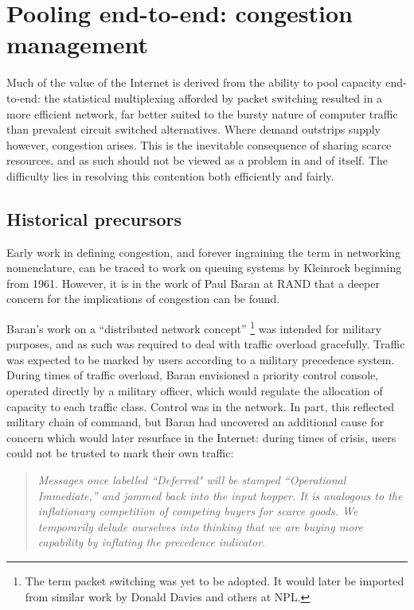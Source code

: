 \section{Pooling end-to-end: congestion management}
\label{sec:resourcepooling:congestion}

Much of the value of the Internet is derived from the ability to pool capacity end-to-end: the statistical multiplexing afforded by packet switching resulted in a more efficient network, far better suited to the bursty nature of computer traffic than prevalent circuit switched alternatives. 
Where demand outstrips supply however, congestion arises. 
This is the inevitable consequence of sharing scarce resources, and as such should not be viewed as a problem in and of itself. 
The difficulty lies in resolving this contention both efficiently and fairly. 

\subsection{Historical precursors}

Early work in defining congestion, and forever ingraining the term in networking nomenclature, can be traced to work on queuing systems by Kleinrock \cite{Kleinrock:1975} beginning from 1961. 
However, it is in the work of Paul Baran at \acs{RAND} \cite{Baran:1964p451} that a deeper concern for the implications of congestion can be found. 

Baran's work on a ``distributed network concept'' \footnote{The term packet switching was yet to be adopted. It would later be imported from similar work by Donald Davies and others at \ac{NPL}.} was intended for military purposes, and as such was required to deal with traffic overload gracefully.
Traffic was expected to be marked by users according to a military precedence system. During times of traffic overload, Baran envisioned a priority control console, operated directly by a military officer, which would regulate the allocation of capacity to each traffic class.
Control was in the network. In part, this reflected military chain of command, but Baran had uncovered an additional cause for concern which would later resurface in the Internet: during times of crisis, users could not be trusted to mark their own traffic:

\begin{quote}
\textit{
Messages once labelled ``Deferred" will be stamped ``Operational Immediate,'' and jammed back into the input hopper. It is analogous to the inflationary competition of competing buyers for scarce goods. We temporarily delude ourselves into thinking that we are buying more capability by inflating the precedence indicator.
}
\end{quote}

